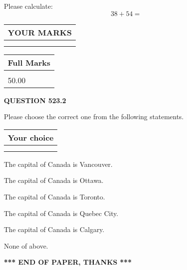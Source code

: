 \documentclass[12pt]{article}
\begin{document}
  
 
Please calculate:
\begin{equation}
38 +  %
54 = \nonumber
\end{equation}
 

 

 
  
\vspace{0.2in}
  
\noindent\begin{tabular}{|l|}
\hline
 YOUR MARKS  \\
\hline
 \\ 
 \\ 
\hline
\end{tabular}
\hspace{0.05in} \begin{tabular}{|l|}
\hline
 Full Marks  \\
\hline
 \\ 
50.00 \\
\hline
\end{tabular}
{\textbf{\Large{QUESTION
523.2 
}}}
  
  
Please choose the correct one from the following statements.
  
  
\noindent\hspace{3.0in} \begin{tabular}{|l|}
\hline
Your choice \\
\hline
 \\ 
 \\ 
\hline
\end{tabular}
  
  
 
 
The capital of Canada is Vancouver.
 
 
The capital of Canada is Ottawa.
 
 
The capital of Canada is Toronto.
 
 
The capital of Canada is Quebec City.
 
 
The capital of Canada is Calgary.
 
 
 None of above.
 
 
   
   
 \vspace{0.2in}
 
   
   
   
   
\vspace{1.0in} 
{\textbf{\large{ *** END OF PAPER, THANKS *** }}} 
   
\end{document}
